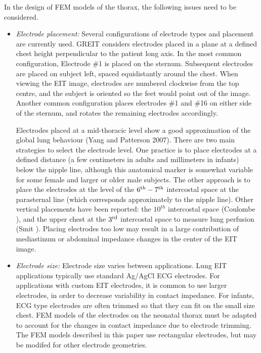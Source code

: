 \documentclass[12pt]{iopart}
\begin{document}
In the design of FEM models of the thorax, the
following issues need to be considered.
\begin{itemize}
\item
{\em Electrode placement:}
Several configurations of electrode types and placement
are currently used. GREIT considers electrodes placed
in a plane at a defined chest height perpendicular to 
the patient long axis. In the most common configuration,
Electrode \#1 is placed on the sternum. Subsequent
electrodes are placed on subject left, spaced equidistantly
around the chest. When viewing the EIT image, electrodes
are numbered clockwise from the top centre, and the subject
is oriented so the feet would point out of the image. Another
common configuration places electrodes \#1 and \#16 on
either side of the sternum, and rotates the remaining 
electrodes accordingly.

\hspace{0.5cm}
Electrodes placed at a mid-thoracic level show a 
good approximation of the global lung behaviour
(Yang and Patterson 2007).
There are two main strategies to select the electrode
level.  One practice is to place
electrodes at a defined distance (a few centimeters 
in adults and millimeters in infants)
below the nipple line, although this anatomical
marker is somewhat variable for some female and
larger or older male subjects. 
The other approach is to 
place the electrodes at the level of the
$6^{\rm th} - 7^{\rm th}$ intercostal space at
the parasternal line (which corresponds approximately
to the nipple line). Other vertical placements have
been reported: the $10^{th}$ intercostal space 
(Coulombe ), and  
the upper chest at the $3^{\rm rd}$ intercostal space
to measure lung perfusion (Smit ).
Placing electrodes too low may result in a large
contribution of mediastinum or abdominal impedance
changes in the center of the EIT image.

\item
{\em Electrode size:}
Electrode size varies between applications. Lung
EIT applications typically
use standard Ag/AgCl ECG electrodes.
For applications with custom EIT electrodes, it is
common to use larger electrodes, in order to decrease
variability in contact impedance. For infants, 
ECG type electrodes are often trimmed so that they
can fit on the small size chest. FEM models of
the electrodes on the neonatal thorax must be adapted
to account for the changes in contact impedance
due to electrode trimming. The FEM models described
in this paper use rectangular electrodes, but may be
modifed for other electrode geometries.


\end{itemize}
\end{document}
